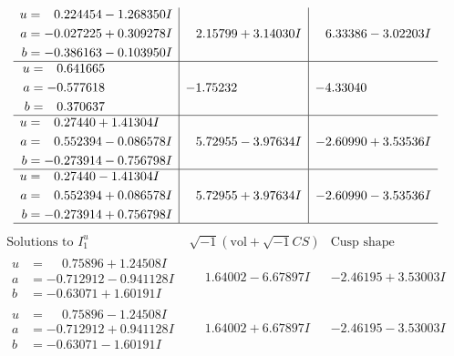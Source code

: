 \documentclass[1p]{elsarticle_modified}
\theoremstyle{definition}
\newcommand{\I}{\sqrt{-1}}
\begin{document}
$$\begin{array}{c|c|c}
\begin{aligned}
u &= \phantom{-}0.224454 - 1.268350 I \\
a &= -0.027225 + 0.309278 I \\
b &= -0.386163 - 0.103950 I\end{aligned}
 & \phantom{-}2.15799 + 3.14030 I & \phantom{-}6.33386 - 3.02203 I \\ \hline\begin{aligned}
u &= \phantom{-}0.641665\phantom{ +0.000000I} \\
a &= -0.577618\phantom{ +0.000000I} \\
b &= \phantom{-}0.370637\phantom{ +0.000000I}\end{aligned}
 & -1.75232\phantom{ +0.000000I} & -4.33040\phantom{ +0.000000I} \\ \hline\begin{aligned}
u &= \phantom{-}0.27440 + 1.41304 I \\
a &= \phantom{-}0.552394 - 0.086578 I \\
b &= -0.273914 - 0.756798 I\end{aligned}
 & \phantom{-}5.72955 - 3.97634 I & -2.60990 + 3.53536 I \\ \hline\begin{aligned}
u &= \phantom{-}0.27440 - 1.41304 I \\
a &= \phantom{-}0.552394 + 0.086578 I \\
b &= -0.273914 + 0.756798 I\end{aligned}
 & \phantom{-}5.72955 + 3.97634 I & -2.60990 - 3.53536 I\\
 \hline 
 \end{array}$$\newpage$$\begin{array}{c|c|c}  
\text{Solutions to }I^u_{1}& \I (\text{vol} + \sqrt{-1}CS) & \text{Cusp shape}\\
 \hline 
\begin{aligned}
u &= \phantom{-}0.75896 + 1.24508 I \\
a &= -0.712912 - 0.941128 I \\
b &= -0.63071 + 1.60191 I\end{aligned}
 & \phantom{-}1.64002 - 6.67897 I & -2.46195 + 3.53003 I \\ \hline\begin{aligned}
u &= \phantom{-}0.75896 - 1.24508 I \\
a &= -0.712912 + 0.941128 I \\
b &= -0.63071 - 1.60191 I\end{aligned}
 & \phantom{-}1.64002 + 6.67897 I & -2.46195 - 3.53003 I \\ \hline\begin{aligned}

\end{aligned}
\end{array}$$
\end{document}
